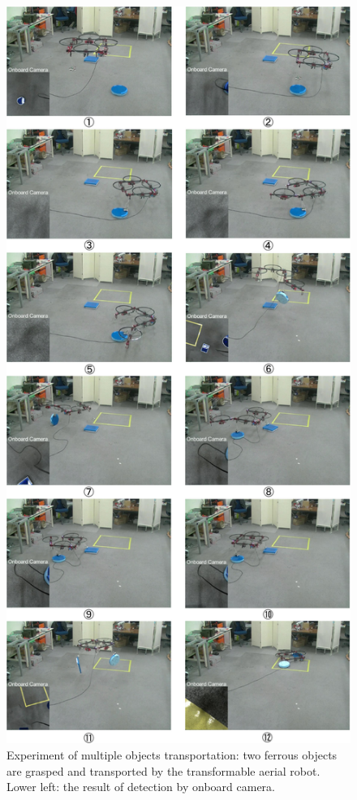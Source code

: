 \documentclass[letterpaper, 10 pt, conference]{ieeeconf}  %
\begin{document}
\begin{figure}[h]                                                                       
  \begin{center}                                                                        
    \includegraphics[width=1.0\columnwidth]{figs/experiment.pdf}                        
  \end{center}                                                                          
  \caption{Experiment of multiple objects transportation: two ferrous objects are grasped and transported by the transformable aerial robot. Lower left: the result of detection by onboard camera. \label{figure:experiment}}          
\end{figure}

%
%
     
\end{document}
